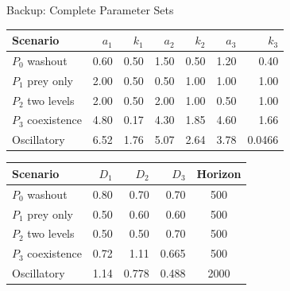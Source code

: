
\backupbegin
\appendix
{}

\begin{frame}[t]{Backup: Complete Parameter Sets}
  \fontsize{9}{11}\selectfont
  \centering
  \renewcommand{\arraystretch}{1.0}
  \begin{tabular}{lrrrrrr}
    \toprule
    Scenario & $a_1$ & $k_1$ & $a_2$ & $k_2$ & $a_3$ & $k_3$ \\
    \midrule
    $P_0$ washout & 0.60 & 0.50 & 1.50 & 0.50 & 1.20 & 0.40 \\
    $P_1$ prey only & 2.00 & 0.50 & 0.50 & 1.00 & 1.00 & 1.00 \\
    $P_2$ two levels & 2.00 & 0.50 & 2.00 & 1.00 & 0.50 & 1.00 \\
    $P_3$ coexistence & 4.80 & 0.17 & 4.30 & 1.85 & 4.60 & 1.66 \\
    Oscillatory & 6.52 & 1.76 & 5.07 & 2.64 & 3.78 & 0.0466 \\
    \bottomrule
  \end{tabular}

  \vspace{0.18cm}
  \begin{tabular}{lrrrc}
    \toprule
    Scenario & $D_1$ & $D_2$ & $D_3$ & Horizon \\
    \midrule
    $P_0$ washout & 0.80 & 0.70 & 0.70 & 500 \\
    $P_1$ prey only & 0.50 & 0.60 & 0.60 & 500 \\
    $P_2$ two levels & 0.50 & 0.50 & 0.70 & 500 \\
    $P_3$ coexistence & 0.72 & 1.11 & 0.665 & 500 \\
    Oscillatory & 1.14 & 0.778 & 0.488 & 2000 \\
    \bottomrule
  \end{tabular}

\end{frame}


